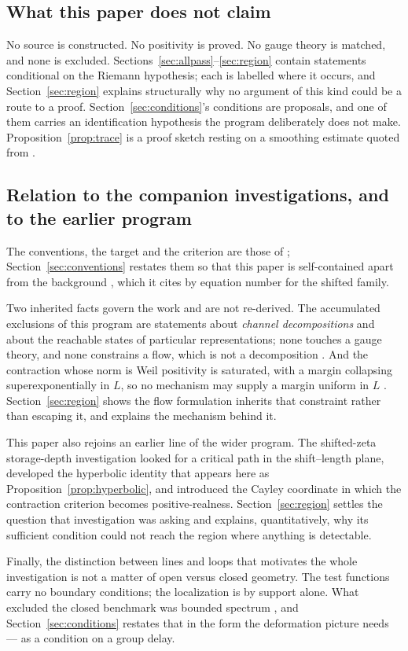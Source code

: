 \subsection*{What this paper does not claim}

No source is constructed. No positivity is proved. No gauge theory is matched,
and none is excluded. Sections~\ref{sec:allpass}--\ref{sec:region} contain
statements conditional on the Riemann hypothesis; each is labelled where it
occurs, and Section~\ref{sec:region} explains structurally why no argument of this
kind could be a route to a proof. Section~\ref{sec:conditions}'s conditions are
proposals, and one of them carries an identification hypothesis the program
deliberately does not make. Proposition~\ref{prop:trace} is a proof sketch resting
on a smoothing estimate quoted from \cite{Background}.

\subsection*{Relation to the companion investigations, and to the earlier program}

The conventions, the target and the criterion are those of
\cite{InverseBulk,Selection}; Section~\ref{sec:conventions} restates them so that
this paper is self-contained apart from the background \cite{Background}, which it
cites by equation number for the shifted family.

Two inherited facts govern the work and are not re-derived. The accumulated
exclusions of this program are statements about \emph{channel decompositions} and
about the reachable states of particular representations; none touches a gauge
theory, and none constrains a flow, which is not a decomposition
\cite{ExclusionMap}. And the contraction whose norm is Weil positivity is
saturated, with a margin collapsing superexponentially in $L$, so no mechanism
may supply a margin uniform in $L$ \cite{Selection}. Section~\ref{sec:region}
shows the flow formulation inherits that constraint rather than escaping it, and
explains the mechanism behind it.

This paper also rejoins an earlier line of the wider program. The shifted-zeta
storage-depth investigation \cite{CriticalPath,CumulativePath} looked for a
critical path in the shift--length plane, developed the hyperbolic identity that
appears here as Proposition~\ref{prop:hyperbolic}, and introduced the Cayley
coordinate in which the contraction criterion becomes positive-realness.
Section~\ref{sec:region} settles the question that investigation was asking and
explains, quantitatively, why its sufficient condition could not reach the region
where anything is detectable.

Finally, the distinction between lines and loops that motivates the whole
investigation is not a matter of open versus closed geometry. The test functions
carry no boundary conditions; the localization is by support alone. What excluded
the closed benchmark was bounded spectrum \cite{Selection,Bottleneck}, and
Section~\ref{sec:conditions} restates that in the form the deformation picture
needs --- as a condition on a group delay.
